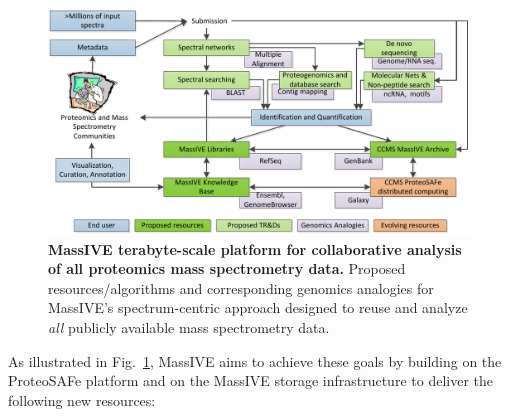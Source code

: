 \documentclass[arial,11pt]{article}
\begin{document}
\begin{figure}[ht]
  \centering
\section{}  \includegraphics[width=\textwidth]{figures/figMassIVE_overview.pdf}
  \caption{\footnotesize \textbf{MassIVE terabyte-scale platform for collaborative analysis of all proteomics mass spectrometry data.} Proposed resources/algorithms and corresponding genomics analogies for MassIVE's spectrum-centric approach designed to reuse and analyze {\em all} publicly available mass spectrometry data.}
  \label{trd.software.fig.massiveKB}
\end{figure}

As illustrated in Fig.~\ref{trd.software.fig.massiveKB}, MassIVE aims to achieve these goals by building on the ProteoSAFe platform and on the MassIVE storage infrastructure to deliver the following new resources:
\end{document}
